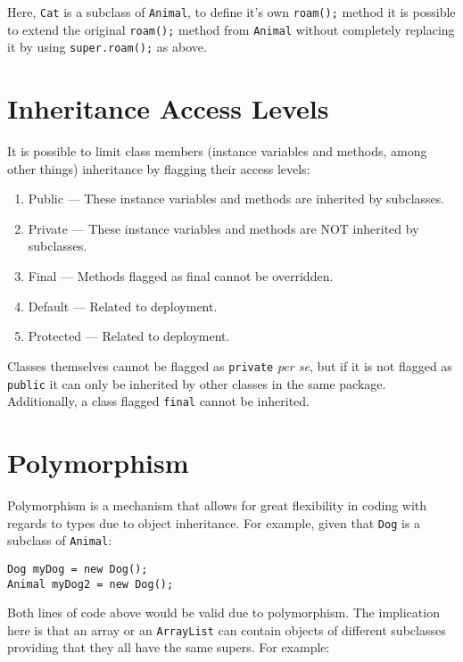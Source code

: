 \documentclass{tufte-handout}
\begin{document}
    Here, \texttt{Cat} is a subclass of \texttt{Animal}, to define it's own \texttt{roam();} method it is possible to extend the original \texttt{roam();} method from \texttt{Animal} without completely replacing it by using \texttt{super.roam();} as above.

    \section*{Inheritance Access Levels}
    It is possible to limit class members (instance variables and methods, among other things) inheritance by flagging their access levels:

    \begin{enumerate}
        \item Public --- These instance variables and methods are inherited by subclasses.
        \item Private --- These instance variables and methods are NOT inherited by subclasses.
        \item Final --- Methods flagged as final cannot be overridden.
        \item Default --- Related to deployment.
        \item Protected --- Related to deployment.
    \end{enumerate}

    Classes themselves cannot be flagged as \texttt{private} \textit{per se}, but if it is not flagged as \texttt{public} it can only be inherited by other classes in the same package. Additionally, a class flagged \texttt{final} cannot be inherited. 

    \section*{Polymorphism}
    Polymorphism is a mechanism that allows for great flexibility in coding with regards to types due to object inheritance. For example, given that \texttt{Dog} is a subclass of \texttt{Animal}:

    \begin{lstlisting}
Dog myDog = new Dog();
Animal myDog2 = new Dog();
    \end{lstlisting}

    Both lines of code above would be valid due to polymorphism. The implication here is that an array or an \texttt{ArrayList} can contain objects of different subclasses providing that they all have the same supers. For example:
\end{document}
